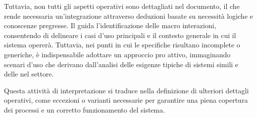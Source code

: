 Tuttavia, non tutti gli aspetti operativi sono dettagliati nel documento, il che rende necessaria un'integrazione attraverso deduzioni basate su necessità logiche e conoscenze pregresse. 
Il  guida l'identificazione delle macro interazioni, consentendo di delineare i casi d'uso principali e il contesto generale in cui il sistema opererà. 
Tuttavia, nei punti in cui le specifiche risultano incomplete o generiche, è indispensabile adottare un approccio pro attivo, immaginando scenari d'uso che derivano dall'analisi delle esigenze tipiche di sistemi simili e delle  nel settore.

Questa attività di interpretazione si traduce nella definizione di ulteriori dettagli operativi, come eccezioni o varianti necessarie per garantire una piena copertura dei processi e un corretto funzionamento del sistema.

